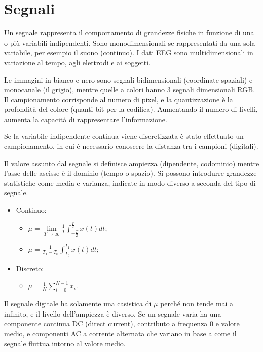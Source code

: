 \section{Segnali}
Un segnale rappresenta il comportamento di grandezze fisiche in funzione di una o più variabili indipendenti. Sono monodimensionali se rappresentati da una sola variabile, per esempio il suono (continuo). I dati EEG sono multidimensionali in variazione al tempo, agli elettrodi e ai soggetti.

Le immagini in bianco e nero sono segnali bidimensionali (coordinate spaziali) e monocanale (il grigio), mentre quelle a colori hanno 3 segnali dimensionali RGB. Il campionamento corrisponde al numero di pixel, e la quantizzazione è la profondità del colore (quanti bit per la codifica). Aumentando il numero di livelli, aumenta la capacità di rappresentare l'informazione.

Se la variabile indipendente continua viene discretizzata è stato effettuato un campionamento, in cui è necessario conoscere la distanza tra i campioni (digitali). 

Il valore assunto dal segnale si definisce ampiezza (dipendente, codominio) mentre l'asse delle ascisse è il dominio (tempo o spazio). Si possono introdurre grandezze statistiche come media e varianza, indicate in modo diverso a seconda del tipo di segnale.

\begin{itemize}
	\item Continuo:
	\begin{itemize}
		\item $\mu = \lim\limits_{T \rightarrow \infty} \frac{1}{T} \int_{-\frac{T}{2}}^{\frac{T}{2}} x(t) dt$;
		\item $\mu = \frac{1}{T_1 - T_0} \int_{T_0}^{T_1} x(t) dt$;
	\end{itemize}
	\item Discreto:
	\begin{itemize}
		\item $\mu = \frac{1}{N} \sum_{i = 0}^{N - 1} x_i$.
	\end{itemize}
\end{itemize}

Il segnale digitale ha solamente una casistica di $\mu$ perché non tende mai a infinito, e il livello dell'ampiezza è diverso. Se un segnale varia ha una componente continua DC (direct current), contributo a frequenza 0 e valore medio, e componenti AC a corrente alternata che variano in base a come il segnale fluttua intorno al valore medio.

